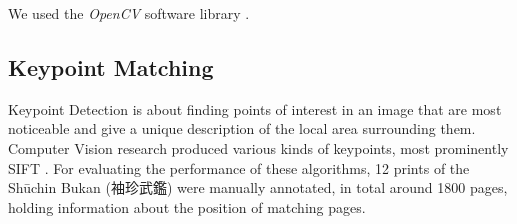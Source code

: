 \documentclass{ltjarticle}
\begin{document}
We used the \emph{OpenCV} software library \cite{opencv_library}.

\subsection{Keypoint Matching}

Keypoint Detection \cite[Ch.4]{szeliski2010computer} is about finding points of interest in an image that are most noticeable and give a unique description of the local area surrounding them. Computer Vision research produced various kinds of keypoints, most prominently SIFT \cite{lowe2004sift}. For evaluating the performance of these algorithms, 12 prints of the Shūchin Bukan (袖珍武鑑) were manually annotated, in total around 1800 pages, holding information about the position of matching pages.
\end{document}
